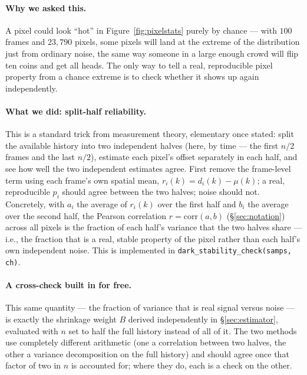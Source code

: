 \documentclass[11pt,a4paper]{article}
\newcommand{\code}[1]{\texttt{#1}}
\begin{document}
\paragraph{Why we asked this.}
A pixel could look ``hot'' in Figure~\ref{fig:pixelstats} purely by chance
--- with $100$ frames and $23{,}790$ pixels, some pixels will land at the
extreme of the distribution just from ordinary noise, the same way someone
in a large enough crowd will flip ten coins and get all heads. The only way
to tell a real, reproducible pixel property from a chance extreme is to
check whether it shows up again independently.

\paragraph{What we did: split-half reliability.}
This is a standard trick from measurement theory, elementary once stated:
split the available history into two independent halves (here, by time ---
the first $n/2$ frames and the last $n/2$), estimate each pixel's offset
separately in each half, and see how well the two independent estimates
agree. First remove the frame-level term using each frame's own spatial
mean, $r_i(k) = d_i(k) - \mu(k)$; a real, reproducible $p_i$ should agree
between the two halves; noise should not. Concretely, with $a_i$ the
average of $r_i(k)$ over the first half and $b_i$ the average over the
second half, the Pearson correlation $r = \mathrm{corr}(a, b)$
(\S\ref{sec:notation}) across all pixels is the fraction of each half's
variance that the two halves share --- i.e., the fraction that is a real,
stable property of the pixel rather than each half's own independent
noise. This is implemented in \code{dark\_stability\_check(samps, ch)}.

\paragraph{A cross-check built in for free.}
This same quantity --- the fraction of variance that is real signal versus
noise --- is exactly the shrinkage weight $B$ derived independently in
\S\ref{sec:estimator}, evaluated with $n$ set to half the full history
instead of all of it. The two methods use completely different arithmetic
(one a correlation between two halves, the other a variance decomposition
on the full history) and should agree once that factor of two in $n$ is
accounted for; where they do, each is a check on the other.
\end{document}
